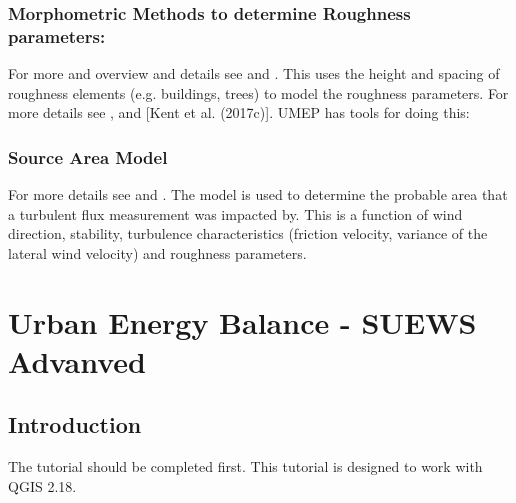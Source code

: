 \documentclass[letterpaper,10pt,english]{sphinxmanual}
\begin{document}
\subsubsection{Morphometric Methods to determine Roughness parameters:}
\label{\detokenize{Tutorials/IntroductionToSuews:morphometric-methods-to-determine-roughness-parameters}}
For more and overview and details see 
and .
This uses the height and spacing of roughness elements (e.g. buildings,
trees) to model the roughness parameters. For more details see ,
and {[}Kent et al. (2017c){]}. UMEP has tools for doing this: 


\subsubsection{Source Area Model}
\label{\detokenize{Tutorials/IntroductionToSuews:source-area-model}}
For more details see 
and .
The 
model is used to determine the probable area that a turbulent flux
measurement was impacted by. This is a function of wind direction,
stability, turbulence characteristics (friction velocity, variance of
the lateral wind velocity) and roughness parameters.


\section{Urban Energy Balance - SUEWS Advanved}
\label{\detokenize{Tutorials/SuewsAdvanced:urban-energy-balance-suews-advanved}}\label{\detokenize{Tutorials/SuewsAdvanced:suewsadvanced}}\label{\detokenize{Tutorials/SuewsAdvanced::doc}}

\subsection{Introduction}
\label{\detokenize{Tutorials/SuewsAdvanced:introduction}}
The tutorial {\hyperref[\detokenize{Tutorials/IntroductionToSuews:introductiontosuews}]{}} should be completed first. This tutorial is designed to work with QGIS 2.18.
\end{document}
